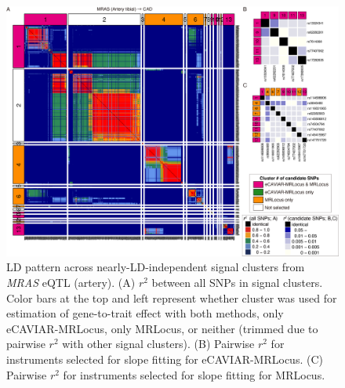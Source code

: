 \documentclass[11pt]{article}
\begin{document}
\begin{figure}[!ht]
  \centering
  \includegraphics[width=\textwidth]{figs/region/heatmap_eQTLbase.Artery_MRAS_CAD.20210114.png}
  \caption{LD pattern across nearly-LD-independent signal clusters
    from \emph{MRAS} eQTL (artery).
    (A) $r^2$ between all SNPs in signal clusters. Color bars at the
    top and left represent whether cluster was used for estimation of
    gene-to-trait effect with both methods, only eCAVIAR-MRLocus, only
    MRLocus, or neither (trimmed due to pairwise $r^2$ with other
    signal clusters). (B) Pairwise $r^2$ for instruments selected for
    slope fitting for eCAVIAR-MRLocus. (C) Pairwise $r^2$ for
    instruments selected for slope fitting for MRLocus.}
\end{figure}
\end{document}
